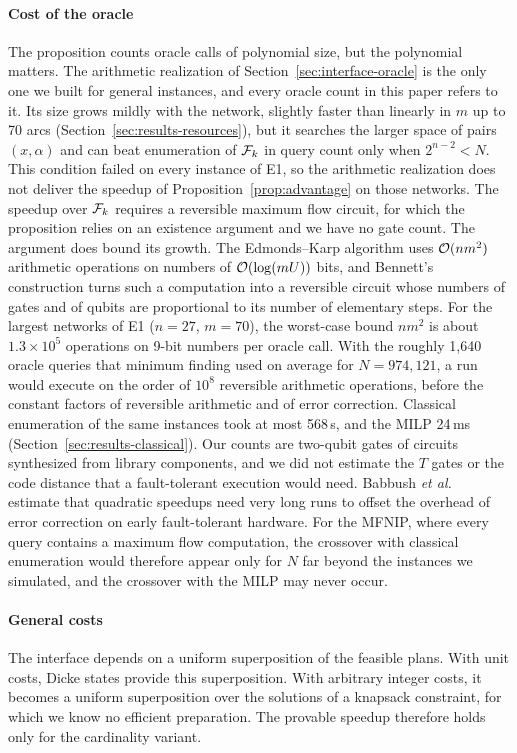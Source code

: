 \paragraph{Cost of the oracle} The proposition counts oracle calls of polynomial size, but the polynomial matters. The arithmetic realization of Section~\ref{sec:interface-oracle} is the only one we built for general instances, and every oracle count in this paper refers to it. Its size grows mildly with the network, slightly faster than linearly in $m$ up to 70 arcs (Section~\ref{sec:results-resources}), but it searches the larger space of pairs $(x,\alpha)$ and can beat enumeration of $\mathcal{F}_k$ in query count only when $2^{n-2}<N$. This condition failed on every instance of E1, so the arithmetic realization does not deliver the speedup of Proposition~\ref{prop:advantage} on those networks. The speedup over $\mathcal{F}_k$ requires a reversible maximum flow circuit, for which the proposition relies on an existence argument and we have no gate count. The argument does bound its growth. The Edmonds--Karp algorithm uses $\mathcal{O}(nm^2)$ arithmetic operations on numbers of $\mathcal{O}(\log(mU))$ bits, and Bennett's construction turns such a computation into a reversible circuit whose numbers of gates and of qubits are proportional to its number of elementary steps. For the largest networks of E1 ($n=27$, $m=70$), the worst-case bound $nm^2$ is about $1.3\times 10^{5}$ operations on 9-bit numbers per oracle call. With the roughly 1{,}640 oracle queries that minimum finding used on average for $N=974{,}121$, a run would execute on the order of $10^{8}$ reversible arithmetic operations, before the constant factors of reversible arithmetic and of error correction. Classical enumeration of the same instances took at most 568\,s, and the MILP 24\,ms (Section~\ref{sec:results-classical}). Our counts are two-qubit gates of circuits synthesized from library components, and we did not estimate the $T$ gates or the code distance that a fault-tolerant execution would need. Babbush \emph{et al.}~\cite{babbush2021} estimate that quadratic speedups need very long runs to offset the overhead of error correction on early fault-tolerant hardware. For the MFNIP, where every query contains a maximum flow computation, the crossover with classical enumeration would therefore appear only for $N$ far beyond the instances we simulated, and the crossover with the MILP may never occur.

\paragraph{General costs} The interface depends on a uniform superposition of the feasible plans. With unit costs, Dicke states provide this superposition. With arbitrary integer costs, it becomes a uniform superposition over the solutions of a knapsack constraint, for which we know no efficient preparation. The provable speedup therefore holds only for the cardinality variant.

